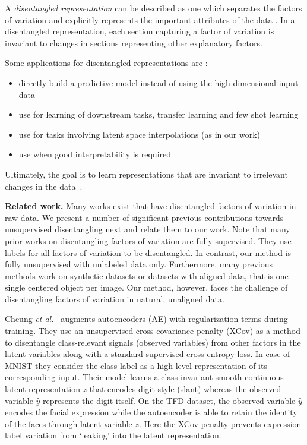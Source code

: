 \documentclass[12pt,a4paper]{article}
\begin{document}
A \textit{disentangled representation} can be described as one which separates the factors of variation and explicitly represents the important attributes of the data \cite{Framework4QuantEvalDisRepr}. In a disentangled representation, each section capturing a factor of variation is invariant to changes in sections representing other explanatory factors.

Some applications for disentangled representations are \cite{ChallengeAssLofDisRepr}:
\begin{itemize}
  \item directly build a predictive model instead of using the high dimensional input data
  \item use for learning of downstream tasks, transfer learning and few shot learning
  \item use for tasks involving latent space interpolations (as in our work)
  \item use when good interpretability is required
\end{itemize}
Ultimately, the goal is to learn representations that are invariant to irrelevant changes in the data~\cite{FwkQuantEvalDisRep}.

\par \textbf{Related work.} Many works exist that have disentangled factors of variation in raw data. We present a number of significant previous contributions towards unsupervised disentangling next and relate them to our work. Note that many prior works on disentangling factors of variation are fully supervised. They use labels for all factors of variation to be disentangled. In contrast, our method is fully unsupervised with unlabeled data only. Furthermore, many previous methods work on synthetic datasets or datasets with aligned data, that is one single centered object per image. Our method, however, faces the challenge of disentangling factors of variation in natural, unaligned data.


\par Cheung \textit{et al.}~\cite{DiscHiddenFoViDN} augments autoencoders (AE) with regularization terms during training. They use an unsupervised cross-covariance penalty (XCov) as a method to disentangle class-relevant signals (observed variables) from other factors in the latent variables along with a standard supervised cross-entropy loss. In case of MNIST they consider the class label as a high-level representation of its corresponding input. Their model learns a class invariant smooth continuous latent representation $z$ that encodes digit style (slant) whereas the observed variable $\hat{y}$ represents the digit itself. On the TFD dataset, the observed variable $\hat{y}$ encodes the facial expression while the autoencoder is able to retain the identity of the faces through latent variable $z$. Here the XCov penalty prevents expression label variation from ‘leaking’ into the latent representation.
\end{document}
